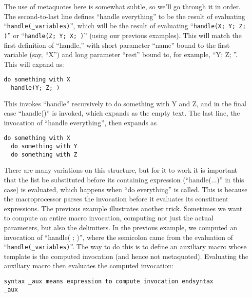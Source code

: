 \documentclass[12pt]{article}
\begin{document}
The use of metaquotes here is somewhat subtle, so we'll go through it in order.
The second-to-last line defines ``handle everything'' to be the result of evaluating ``\lstinline"handle(_variables)"'', which will be the result of evaluating ``\lstinline"handle(X; Y; Z; )"'' or ``\lstinline"handle(Z; Y; X; )"'' (using our previous examples).
This will match the first definition of ``handle,'' with short parameter ``name'' bound to the first variable (say, ``X'') and long parameter  ``rest'' bound to, for example, ``Y; Z; ''.
This will expand as:
\begin{lstlisting}[frame=single]
  do something with X
  handle(Y; Z; )
\end{lstlisting}
This invokes ``handle'' recursively to do something with Y and Z, and in the final case ``handle()'' is invoked, which expands as the empty text.
The last line, the invocation of ``handle everything'', then expands as
\begin{lstlisting}[frame=single]
  do something with X
  do something with Y
  do something with Z
\end{lstlisting}
There are many variations on this structure, but for it to work it is important that the list be substituted before its containing expression (``handle(...)'' in this case) is evaluated, which happens when ``do everything'' is called.
This is because the macroprocessor parses the invocation before it evaluates its constituent expressions.
The previous example illustrates another trick.
Sometimes we want to compute an entire macro invocation, computing not just the actual parameters, but also the delimiters.
In the previous example, we computed an invocation of ``handle( ; )'', where the semicolon came from the evaluation of ``\lstinline"handle(_variables)"''.
The way to do this is to define an auxiliary macro whose template is the computed invocation (and hence not metaquoted).
Evaluating the auxiliary macro then evaluates the computed invocation:
\begin{lstlisting}[frame=single]
syntax _aux means expression to compute invocation endsyntax
_aux
\end{lstlisting}
\end{document}

